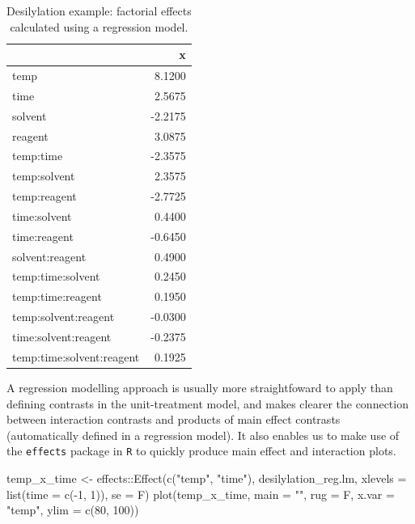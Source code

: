 \documentclass[
]{book}
\newenvironment{Shaded}{\begin{snugshade}}{\end{snugshade}}
\newcommand{\AttributeTok}[1]{\textcolor[rgb]{0.77,0.63,0.00}{#1}}
\newcommand{\DecValTok}[1]{\textcolor[rgb]{0.00,0.00,0.81}{#1}}
\newcommand{\FunctionTok}[1]{\textcolor[rgb]{0.00,0.00,0.00}{#1}}
\newcommand{\NormalTok}[1]{#1}
\newcommand{\OtherTok}[1]{\textcolor[rgb]{0.56,0.35,0.01}{#1}}
\newcommand{\SpecialCharTok}[1]{\textcolor[rgb]{0.00,0.00,0.00}{#1}}
\newcommand{\StringTok}[1]{\textcolor[rgb]{0.31,0.60,0.02}{#1}}
\theoremstyle{definition}
\theoremstyle{definition}
\theoremstyle{definition}
\theoremstyle{definition}
\theoremstyle{remark}
\begin{document}
\begin{table}

\caption{\label{tab:desilylation-reg}Desilylation example: factorial effects calculated using a regression model.}
\centering
\begin{tabular}[t]{l|r}
\hline
  & x\\
\hline
temp & 8.1200\\
\hline
time & 2.5675\\
\hline
solvent & -2.2175\\
\hline
reagent & 3.0875\\
\hline
temp:time & -2.3575\\
\hline
temp:solvent & 2.3575\\
\hline
temp:reagent & -2.7725\\
\hline
time:solvent & 0.4400\\
\hline
time:reagent & -0.6450\\
\hline
solvent:reagent & 0.4900\\
\hline
temp:time:solvent & 0.2450\\
\hline
temp:time:reagent & 0.1950\\
\hline
temp:solvent:reagent & -0.0300\\
\hline
time:solvent:reagent & -0.2375\\
\hline
temp:time:solvent:reagent & 0.1925\\
\hline
\end{tabular}
\end{table}

A regression modelling approach is usually more straightfoward to apply than defining contrasts in the unit-treatment model, and makes clearer the connection between interaction contrasts and products of main effect contrasts (automatically defined in a regression model). It also enables us to make use of the \texttt{effects} package in \texttt{R} to quickly produce main effect and interaction plots.

\begin{Shaded}
\begin{Highlighting}[]
\NormalTok{temp\_x\_time }\OtherTok{\textless{}{-}}\NormalTok{ effects}\SpecialCharTok{::}\FunctionTok{Effect}\NormalTok{(}\FunctionTok{c}\NormalTok{(}\StringTok{"temp"}\NormalTok{, }\StringTok{"time"}\NormalTok{), desilylation\_reg.lm, }\AttributeTok{xlevels =} \FunctionTok{list}\NormalTok{(}\AttributeTok{time =} \FunctionTok{c}\NormalTok{(}\SpecialCharTok{{-}}\DecValTok{1}\NormalTok{, }\DecValTok{1}\NormalTok{)), }\AttributeTok{se =}\NormalTok{ F)}
\FunctionTok{plot}\NormalTok{(temp\_x\_time, }\AttributeTok{main =} \StringTok{""}\NormalTok{, }\AttributeTok{rug =}\NormalTok{ F, }\AttributeTok{x.var =} \StringTok{"temp"}\NormalTok{, }\AttributeTok{ylim =} \FunctionTok{c}\NormalTok{(}\DecValTok{80}\NormalTok{, }\DecValTok{100}\NormalTok{))}
\end{Highlighting}
\end{Shaded}
\end{document}
